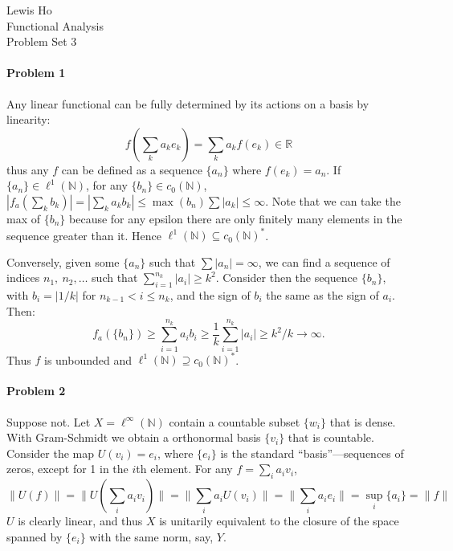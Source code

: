\documentclass[12pt]{article}
\newcommand{\N}{\mathbb{N}}
\begin{document}
\begin{center}
  Lewis Ho\\
  Functional Analysis\\
  Problem Set 3
\end{center}

\paragraph{Problem 1}

Any linear functional can be fully determined by its actions on a basis by
linearity:
\begin{displaymath}
  f\left(\sum_ka_ke_k\right) = \sum_k a_kf(e_k) \in \mathbb{R}
\end{displaymath}
thus any $f$ can be defined as a sequence $\{a_n\}$ where $f(e_k) = a_n$. If
$\{a_n\} \in \ell^1(\mathbb{N})$, for any $\{b_n\} \in c_0(\N)$, $|f_{a}
(\sum_kb_k)| = |\sum_ka_kb_k| \leq \max(b_n)\sum|a_k| \leq \infty$. Note that we
can take the max of $\{b_n\}$ because for any epsilon there are only finitely
many elements in the sequence greater than it. Hence $\ell^1(\N) \subseteq
c_0(\N)^*$.

Conversely, given some $\{a_n\}$ such that $\sum|a_n| = \infty$, we can find a
sequence of indices $n_1,\ n_2,\ldots$ such that $\sum_{i=1}^{n_k}|a_i| \geq
k^2$. Consider then the sequence $\{b_n\}$, with $b_i = |1/k|$ for $n_{k-1} <
i \leq n_k$, and the sign of $b_i$ the same as the sign of $a_i$. Then:
\begin{displaymath}
  f_a(\{b_n\}) \geq \sum_{i=1}^{n_k}a_ib_i \geq \frac{1}{k}\sum_{i=1}^{n_k}|a_i|
  \geq k^2/k \to \infty.
\end{displaymath}
Thus $f$ is unbounded and $\ell^1(\N) \supseteq c_0(\N)^*$.

\paragraph{Problem 2}

Suppose not. Let $X=\ell^\infty(\N)$ contain a countable subset $\{w_i\}$ that is
dense. With Gram-Schmidt we obtain a orthonormal basis $\{v_i\}$ that is
countable. Consider the map $U(v_i) = e_i$, where $\{e_i\}$ is the standard
``basis''---sequences of zeros, except for 1 in the $i$th element. For any
$f = \sum_ia_iv_i$,
\begin{displaymath}
  \|U(f)\| = \|U(\sum_ia_iv_i)\| = \|\sum_ia_iU(v_i)\|
  = \|\sum_ia_ie_i\| = \sup_i\{a_i\} = \|f\|
\end{displaymath}
$U$ is clearly linear, and thus
$X$ is unitarily equivalent to the closure of the space spanned
by $\{e_i\}$ with the same norm, say, $Y$.
\end{document}
